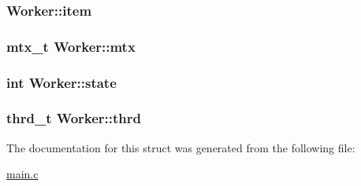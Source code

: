 \subsubsection[{\texorpdfstring{item}{item}}]{ Worker\+::item}\hypertarget{structWorker_a5543b8205b70f14eaf07a15bd255580a}{}\label{structWorker_a5543b8205b70f14eaf07a15bd255580a}
\subsubsection[{\texorpdfstring{mtx}{mtx}}]{\setlength{\rightskip}{0pt plus 5cm}mtx\+\_\+t Worker\+::mtx}\hypertarget{structWorker_a94f77d872408098dc5ff3d6380161c96}{}\label{structWorker_a94f77d872408098dc5ff3d6380161c96}
\subsubsection[{\texorpdfstring{state}{state}}]{\setlength{\rightskip}{0pt plus 5cm}int Worker\+::state}\hypertarget{structWorker_a1003e459fb7686782b33812bc9bbe95c}{}\label{structWorker_a1003e459fb7686782b33812bc9bbe95c}
\subsubsection[{\texorpdfstring{thrd}{thrd}}]{\setlength{\rightskip}{0pt plus 5cm}thrd\+\_\+t Worker\+::thrd}\hypertarget{structWorker_aadc19b994d770006cb5303fa46a257f8}{}\label{structWorker_aadc19b994d770006cb5303fa46a257f8}


The documentation for this struct was generated from the following file\+:\begin{DoxyCompactItemize}
\item 
\hyperlink{main_8c}{main.\+c}\end{DoxyCompactItemize}
